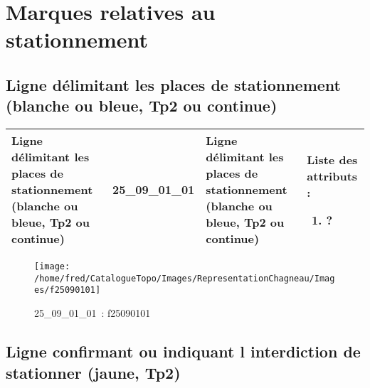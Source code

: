 \documentclass[12pt,titlepage]{book}
\begin{document}
\section{\large Marques relatives au stationnement}
\subsection{Ligne délimitant les places de stationnement (blanche ou bleue, Tp2 ou continue)}
\noindent
\vspace{\baselineskip}

\renewcommand{\arraystretch}{1.2}
\begin{supertabular}{|p{10cm}|c|p{13cm}|p{12cm}|}
 Ligne délimitant les places de stationnement (blanche ou bleue, Tp2 ou continue) & 25\_09\_01\_01 & Ligne délimitant les places de stationnement (blanche ou bleue, Tp2 ou continue) & Liste des attributs :
\begin{enumerate}
  \item ?\end{enumerate}
\\
\hline
\end{supertabular}
\begin{figure}[h!]
  \hfill         %
  \begin{minipage}[t]{3cm}
    \begin{center}
      \texttt{[image: /home/fred/CatalogueTopo/Images/RepresentationChagneau/Images/f25090101]}
      \caption[~25\_09\_01\_01]{\small{25\_09\_01\_01~:} \tiny{f25090101}}\label{f25090101}
    \end{center}
  \end{minipage}
\end{figure}


\subsection{Ligne confirmant ou indiquant l interdiction de stationner (jaune, Tp2)}
\noindent
\vspace{\baselineskip}
\end{document}
